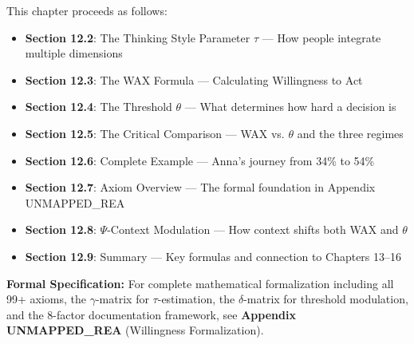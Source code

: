 This chapter proceeds as follows:

\begin{itemize}
\item \textbf{Section 12.2}: The Thinking Style Parameter $\tau$ — How people integrate multiple dimensions
\item \textbf{Section 12.3}: The WAX Formula — Calculating Willingness to Act
\item \textbf{Section 12.4}: The Threshold $\theta$ — What determines how hard a decision is
\item \textbf{Section 12.5}: The Critical Comparison — WAX vs. $\theta$ and the three regimes
\item \textbf{Section 12.6}: Complete Example — Anna's journey from 34\% to 54\%
\item \textbf{Section 12.7}: Axiom Overview — The formal foundation in Appendix UNMAPPED_REA
\item \textbf{Section 12.8}: $\Psi$-Context Modulation — How context shifts both WAX and $\theta$
\item \textbf{Section 12.9}: Summary — Key formulas and connection to Chapters 13--16
\end{itemize}

\begin{cross-reference}
\textbf{Formal Specification:} For complete mathematical formalization including 
all 99+ axioms, the $\gamma$-matrix for $\tau$-estimation, the $\delta$-matrix 
for threshold modulation, and the 8-factor documentation framework, 
see \textbf{Appendix UNMAPPED_REA} (Willingness Formalization).
\end{cross-reference}

